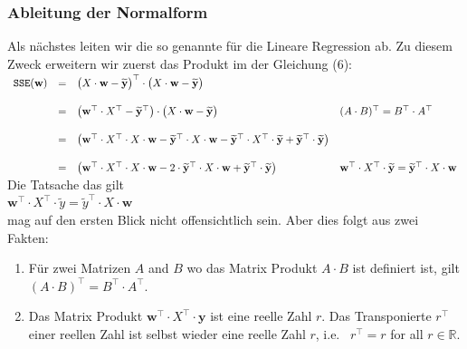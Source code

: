 \documentclass[12pt]{article}
\begin{document}
\subsubsection{Ableitung der Normalform}
%
Als nächstes leiten wir die so genannte {\color{blue}{Normalform}}  für die Lineare Regression ab. Zu diesem Zweck   erweitern wir zuerst das Produkt im der Gleichung (6):
\\[0.2cm]
\hspace*{-0.2cm}
$
\begin{array}[t]{lcll}
 \mathtt{SSE}(\mathbf{w}) & = & 
 \bigl(X \cdot \mathbf{w} - \mathbf{\widetilde{y}}\bigr)^\top \cdot \bigl(X \cdot \mathbf{w} - \mathbf{\widetilde{y}}\bigr) 
 \\[0.5cm]
 & = & 
 \bigl(\mathbf{w}^\top \cdot X^\top - \mathbf{\widetilde{y}}^\top\bigr) \cdot \bigl(X \cdot \mathbf{w} - \mathbf{\widetilde{y}}\bigr) 
 & \mbox{$(A \cdot B)^\top = B^\top \cdot A^\top$}
 \\[0.5cm]
 & = & 
 \bigl(\mathbf{w}^\top \cdot X^\top \cdot X \cdot \mathbf{w} - \mathbf{\widetilde{y}}^\top \cdot X \cdot \mathbf{w} 
 - \mathbf{\widetilde{y}}^\top \cdot X^\top \cdot \mathbf{\widetilde{y}}
+ \mathbf{\widetilde{y}}^\top \cdot \mathbf{\widetilde{y}} \bigr)
 \\[0.5cm]
 & = & 
 \bigl(\mathbf{w}^\top \cdot X^\top \cdot X \cdot \mathbf{w} - 2 \cdot \mathbf{\widetilde{y}}^\top \cdot X \cdot \mathbf{w} 
 +  \mathbf{\widetilde{y}}^\top \cdot \mathbf{\widetilde{y}} \bigr)
 & \mbox{$ \mathbf{w}^\top \cdot X^\top \cdot \mathbf{\widetilde{y}} = \mathbf{\widetilde{y}}^\top \cdot X \cdot \mathbf{w}$}
\end{array}
$
\\[0.4cm]
Die Tatsache das gilt 
\\[0.2cm]
\hspace*{1.3cm}
$\mathbf{w}^\top \cdot X^\top \cdot \widetilde{y} = \widetilde{y}^\top \cdot X \cdot \mathbf{w}$
\\[0.2cm]
mag auf den ersten Blick nicht offensichtlich sein. Aber dies folgt aus zwei Fakten:
\begin{enumerate}
\item Für zwei Matrizen $A$ and $B$ wo das Matrix Produkt $A \cdot B$ ist definiert ist, gilt  
      \\[0.2cm]
      \hspace*{1.3cm}
      $(A \cdot B)^\top = B^\top \cdot A^\top$.
\item Das Matrix Produkt $\mathbf{w}^\top \cdot X^\top \cdot \mathbf{y}$ ist eine reelle Zahl $r$. Das Transponierte  $r^\top$ einer reellen Zahl ist selbst wieder eine reelle Zahl $r$, i.e. ~$r^\top = r$ for all $r \in \mathbb{R}$. \\[0.4cm] 
\end{enumerate}
\end{document}
